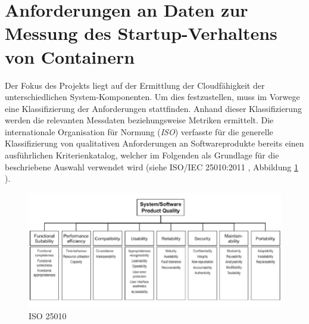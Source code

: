 \section{Anforderungen an Daten zur Messung des Startup-Verhaltens von Containern \checkmark \checkmark}
\label{sec:startupAnforderungen}


Der Fokus des Projekts liegt auf der Ermittlung der Cloudfähigkeit der unterschiedlichen System-Komponenten. Um dies festzustellen, muss im Vorwege eine Klassifizierung der Anforderungen stattfinden. Anhand dieser Klassifizierung werden die relevanten Messdaten beziehungsweise Metriken ermittelt. Die internationale Organisation für Normung (\emph{ISO}) verfasste für die generelle Klassifizierung von qualitativen Anforderungen an Softwareprodukte bereits einen ausführlichen Kriterienkatalog, welcher im Folgenden als Grundlage für die beschriebene Auswahl verwendet wird (siehe ISO/IEC 25010:2011 \cite{iso25010}, Abbildung \ref{fig:iso25010} ). 

\begin{figure}[ht!]
	\centering
	\includegraphics[width=\linewidth]{kapitel/vorgehensmodell/kriterienkatalog/_img/iso25010}
	\caption[iso25010]{ISO 25010}
	\label{fig:iso25010}
\end{figure}


